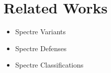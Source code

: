 \section{Related Works}
\begin{itemize}
	\item Spectre Variants
	\item Spectre Defenses
	\item Spectre Classifications
\end{itemize}
